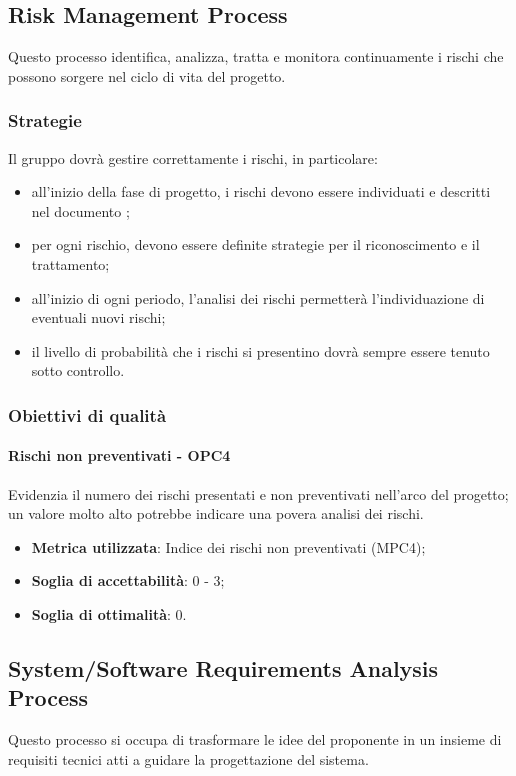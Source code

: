 \documentclass[PianoDiQualifica.tex]{subfiles}
\begin{document}
	\subsection{Risk Management Process}
		Questo processo identifica, analizza, tratta e monitora continuamente i rischi che possono sorgere nel ciclo di vita del progetto.
		
		\subsubsection{Strategie}
			Il gruppo dovrà gestire correttamente i rischi, in particolare:
			\begin{itemize}
				\item all'inizio della fase di progetto, i rischi devono essere individuati e descritti nel documento \PPdocRP{};
				\item per ogni rischio, devono essere definite strategie per il riconoscimento e il trattamento;
				\item all'inizio di ogni periodo, l'analisi dei rischi permetterà l'individuazione di eventuali nuovi rischi;
				\item il livello di probabilità che i rischi si presentino dovrà sempre essere tenuto sotto controllo.
			\end{itemize}
			
		\subsubsection{Obiettivi di qualità}
			\paragraph{Rischi non preventivati - OPC4}
				Evidenzia il numero dei rischi presentati e non preventivati nell'arco del progetto; un valore molto alto potrebbe indicare una povera analisi dei rischi.
				\begin{itemize}
					\item \textbf{Metrica utilizzata}: Indice dei rischi non preventivati (MPC4);
					\item \textbf{Soglia di accettabilità}: 0 - 3;
					\item \textbf{Soglia di ottimalità}: 0.
				\end{itemize}

	\subsection{System/Software Requirements Analysis Process}
		Questo processo si occupa di trasformare le idee del proponente in un insieme di requisiti tecnici atti a guidare la progettazione del sistema.
		
\end{document}
